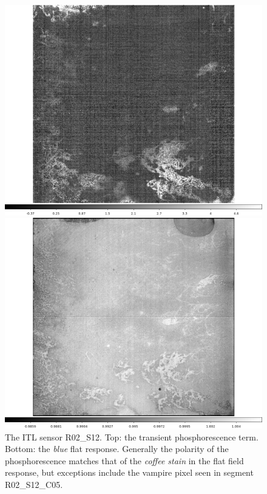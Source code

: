 \begin{figure}[!htbp]
\centering
\begin{minipage}{1.0\textwidth}    
  \centering
  \includegraphics[width=.6\linewidth]{figures/phosphorescence-survey/stains_phos_R02_S12.png}    
\end{minipage}
\begin{minipage}{1.0\textwidth}
  \centering
  \includegraphics[width=.6\linewidth]{figures/phosphorescence-survey/stains_abs_R02_S12.png}
\end{minipage}
\caption{The ITL sensor R02\_S12. Top: the transient phosphorescence term. Bottom: the {\it blue} flat response. Generally the polarity of the phosphorescence matches that of the {\it coffee stain} in the flat field response, but exceptions include the vampire pixel seen in segment R02\_S12\_C05.}
\label{fig:phos:stains:R02S12}
\end{figure}


